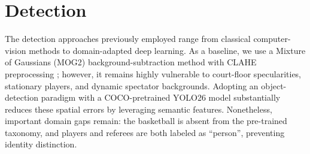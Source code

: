 \section{Detection}\label{sec:detection}

The detection approaches previously employed range from classical computer-vision methods to domain-adapted deep learning.
As a baseline, we use a Mixture of Gaussians (MOG2) background-subtraction method \cite{survey} with CLAHE preprocessing \cite{clahe}; however, it remains highly vulnerable to court-floor specularities, stationary players, and dynamic spectator backgrounds.
Adopting an object-detection paradigm with a COCO-pretrained YOLO26 model \cite{yolo_paper} substantially reduces these spatial errors by leveraging semantic features.
Nonetheless, important domain gaps remain: the basketball is absent from the pre-trained taxonomy, and players and referees are both labeled as ``person'', preventing identity distinction.





